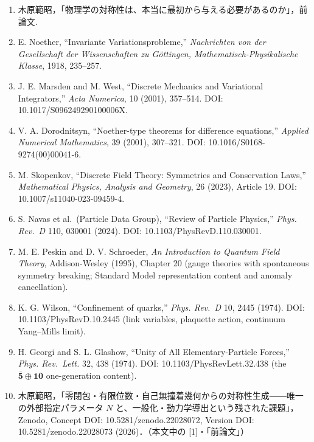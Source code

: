 \documentclass[
  a4paper,
]{ltjsarticle}
\providecommand{\tightlist}{%
  \setlength{\itemsep}{0pt}\setlength{\parskip}{0pt}}
\begin{document}
\begin{enumerate}
\def\labelenumi{\arabic{enumi}.}
\tightlist
\item
  木原範昭，「物理学の対称性は、本当に最初から与える必要があるのか」，前論文.
\item
  E. Noether, ``Invariante Variationsprobleme,'' \emph{Nachrichten von
  der Gesellschaft der Wissenschaften zu Göttingen,
  Mathematisch-Physikalische Klasse}, 1918, 235--257.
\item
  J. E. Marsden and M. West, ``Discrete Mechanics and Variational
  Integrators,'' \emph{Acta Numerica}, 10 (2001), 357--514. DOI:
  10.1017/S096249290100006X.
\item
  V. A. Dorodnitsyn, ``Noether-type theorems for difference equations,''
  \emph{Applied Numerical Mathematics}, 39 (2001), 307--321. DOI:
  10.1016/S0168-9274(00)00041-6.
\item
  M. Skopenkov, ``Discrete Field Theory: Symmetries and Conservation
  Laws,'' \emph{Mathematical Physics, Analysis and Geometry}, 26 (2023),
  Article 19. DOI: 10.1007/s11040-023-09459-4.
\item
  S. Navas et al.~(Particle Data Group), ``Review of Particle Physics,''
  \emph{Phys. Rev.~D} 110, 030001 (2024). DOI:
  10.1103/PhysRevD.110.030001.
\item
  M. E. Peskin and D. V. Schroeder, \emph{An Introduction to Quantum
  Field Theory}, Addison-Wesley (1995), Chapter 20 (gauge theories with
  spontaneous symmetry breaking; Standard Model representation content
  and anomaly cancellation).
\item
  K. G. Wilson, ``Confinement of quarks,'' \emph{Phys. Rev.~D} 10, 2445
  (1974). DOI: 10.1103/PhysRevD.10.2445 (link variables, plaquette
  action, continuum Yang--Mills limit).
\item
  H. Georgi and S. L. Glashow, ``Unity of All Elementary-Particle
  Forces,'' \emph{Phys. Rev.~Lett.} 32, 438 (1974). DOI:
  10.1103/PhysRevLett.32.438 (the
  \(\overline{\mathbf 5}\oplus\mathbf{10}\) one-generation content).
\item
  木原範昭，「零閉包・有限位数・自己無撞着幾何からの対称性生成――唯一の外部指定パラメータ
  \(N\) と、一般化・動力学導出という残された課題」，Zenodo, Concept DOI:
  10.5281/zenodo.22028072, Version DOI: 10.5281/zenodo.22028073
  (2026)．（本文中の {[}1{]}・「前論文」）
\end{enumerate}
\end{document}
